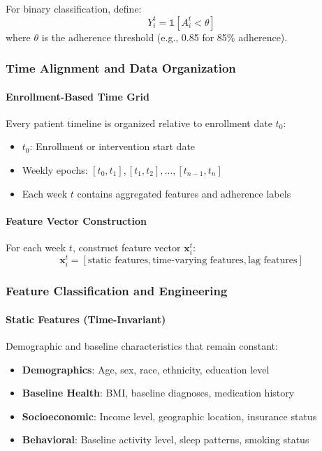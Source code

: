 \documentclass[12pt]{article}
\begin{document}
For binary classification, define:
\begin{equation}
Y_i^t = \mathbb{1}[A_i^t < \theta]
\end{equation}
where $\theta$ is the adherence threshold (e.g., 0.85 for 85\% adherence).

\subsubsection{Time Alignment and Data Organization}

\paragraph{Enrollment-Based Time Grid}
Every patient timeline is organized relative to enrollment date $t_0$:
\begin{itemize}
    \item $t_0$: Enrollment or intervention start date
    \item Weekly epochs: $[t_0, t_1], [t_1, t_2], \ldots, [t_{n-1}, t_n]$
    \item Each week $t$ contains aggregated features and adherence labels
\end{itemize}

\paragraph{Feature Vector Construction}
For each week $t$, construct feature vector $\mathbf{x}_i^t$:
\begin{equation}
\mathbf{x}_i^t = [\text{static features}, \text{time-varying features}, \text{lag features}]
\end{equation}

\subsubsection{Feature Classification and Engineering}

\paragraph{Static Features (Time-Invariant)}
Demographic and baseline characteristics that remain constant:
\begin{itemize}
    \item \textbf{Demographics}: Age, sex, race, ethnicity, education level
    \item \textbf{Baseline Health}: BMI, baseline diagnoses, medication history
    \item \textbf{Socioeconomic}: Income level, geographic location, insurance status
    \item \textbf{Behavioral}: Baseline activity level, sleep patterns, smoking status
\end{itemize}
\end{document}
